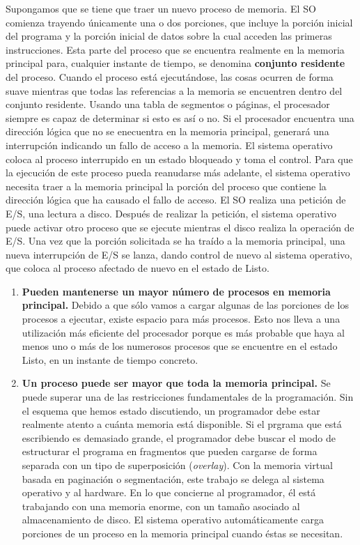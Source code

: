 \documentclass{article}
\begin{document}
		Supongamos que se tiene que traer un nuevo proceso de memoria. El SO comienza trayendo únicamente una o dos porciones, que incluye la porción inicial del programa y la porción inicial de datos sobre la cual acceden las primeras instrucciones. Esta parte del proceso que se encuentra realmente en la memoria principal para, cualquier instante de tiempo, se denomina \textbf{conjunto residente} del proceso. Cuando el proceso está ejecutándose, las cosas ocurren de forma suave mientras que todas las referencias a la memoria se encuentren dentro del conjunto residente. Usando una tabla de segmentos o páginas, el procesador siempre es capaz de determinar si esto es así o no. Si el procesador encuentra una dirección lógica que no se enecuentra en la memoria principal, generará una interrupción indicando un fallo de acceso a la memoria. El sistema operativo coloca al proceso interrupido en un estado bloqueado y toma el control. Para que la ejecución de este proceso pueda reanudarse más adelante, el sistema operativo necesita traer a la memoria principal la porción del proceso que contiene la dirección lógica que ha causado el fallo de acceso. El SO realiza una petición de E/S, una lectura a disco. Después de realizar la petición, el sistema operativo puede activar otro proceso que se ejecute mientras el disco realiza la operación de E/S. Una vez que la porción solicitada se ha traído a la memoria principal, una nueva interrupción de E/S se lanza, dando control de nuevo al sistema operativo, que coloca al proceso afectado de nuevo en el estado de Listo. \\
		
		\begin{enumerate}
		\item \textbf{Pueden mantenerse un mayor número de procesos en memoria principal.} Debido a que sólo vamos a cargar algunas de las porciones de los procesos a ejecutar, existe espacio para más procesos. Esto nos lleva a una utilización más eficiente del procesador porque es más probable que haya al menos uno o más de los numerosos procesos que se encuentre en el estado Listo, en un instante de tiempo concreto.
		\item \textbf{Un proceso puede ser mayor que toda la memoria principal.} Se puede superar una de las restricciones fundamentales de la programación. Sin el esquema que hemos estado discutiendo, un programador debe estar realmente atento a cuánta memoria está disponible. Si el prgrama que está escribiendo es demasiado grande, el programador debe buscar el modo de estructurar el programa en fragmentos que pueden cargarse de forma separada con un tipo de superposición (\textit{overlay}). Con la memoria virtual basada en paginación o segmentación, este trabajo se delega al sistema operativo y al hardware. En lo que concierne al programador, él está trabajando con una memoria enorme, con un tamaño asociado al almacenamiento de disco. El sistema operativo automáticamente carga porciones de un proceso en la memoria principal cuando éstas se necesitan.
		\end{enumerate}
		
\end{document}
